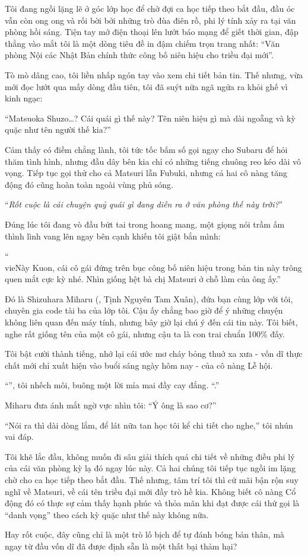 \documentclass[../main.tex]{subfiles}
\begin{document}
Tôi đang ngồi lặng lẽ ở góc lớp học để chờ đợi ca học tiếp theo bắt đầu, đầu óc vẫn còn ong ong và rối bời bởi những trò đùa điên rồ, phi lý tính xảy ra tại văn phòng hồi sáng. Tiện tay mở điện thoại lên lướt báo mạng để giết thời gian, đập thẳng vào mắt tôi là một dòng tiêu đề in đậm chiếm trọn trang nhất: ``Văn phòng Nội các Nhật Bản chính thức công bố niên hiệu cho triều đại mới''.

Tò mò dâng cao, tôi liền nhấp ngón tay vào xem chi tiết bản tin. Thế nhưng, vừa mới đọc lướt qua mấy dòng đầu tiên, tôi đã suýt nữa ngã ngửa ra khỏi ghế vì kinh ngạc:

``Matsuoka Shuzo\dots? Cái quái gì thế này? Tên niên hiệu gì mà dài ngoẵng và kỳ quặc như tên người thế kia?''

Cảm thấy có điềm chẳng lành, tôi tức tốc bấm số gọi ngay cho Subaru để hỏi thăm tình hình, nhưng đầu dây bên kia chỉ có những tiếng chuông reo kéo dài vô vọng. Tiếp tục gọi thử cho cả Matsuri lẫn Fubuki, nhưng cả hai cô nàng tăng động đó cũng hoàn toàn ngoài vùng phủ sóng.

``\textit{Rốt cuộc là cái chuyện quỷ quái gì đang diễn ra ở văn phòng thế này trời?}''

Đúng lúc tôi đang vò đầu bứt tai trong hoang mang, một giọng nói trầm ấm thình lình vang lên ngay bên cạnh khiến tôi giật bắn mình:

``\\vie{Này Kuon, cái cô gái đứng trên bục công bố niên hiệu trong bản tin này trông quen mắt cực kỳ nhé. Nhìn giống hệt bà chị Matsuri ở chỗ làm của ông ấy}.''

Đó là Shizuhara Miharu (, Tịnh Nguyên Tam Xuân), đứa bạn cùng lớp với tôi, chuyên gia code tài ba của lớp tôi. Cậu ấy chẳng bao giờ để ý những chuyện không liên quan đến máy tính, nhưng bây giờ lại chú ý đến cái tin này. Tôi biết, nghe rất giống tên của một cô gái, nhưng cậu ta là con trai chuẩn 100\%{} đấy.

Tôi bật cười thành tiếng, nhớ lại cái ước mơ cháy bỏng thuở xa xưa - vốn dĩ thực chất mới chỉ xuất hiện vào buổi sáng ngày hôm nay - của cô nàng Lễ hội.

``'', tôi nhếch môi, buông một lời mỉa mai đầy cay đắng. ``.''

Miharu đưa ánh mắt ngờ vực nhìn tôi: ``Ý ông là sao cơ?''

``Nói ra thì dài dòng lắm, để lát nữa tan học tôi kể chi tiết cho nghe,'' tôi nhún vai đáp.

Tôi khẽ lắc đầu, không muốn đi sâu giải thích quá chi tiết về những điều phi lý của cái văn phòng kỳ lạ đó ngay lúc này. Cả hai chúng tôi tiếp tục ngồi im lặng chờ cho ca học tiếp theo bắt đầu. Thế nhưng, tâm trí tôi thì cứ mãi bận rộn suy nghĩ về Matsuri, về cái tên triều đại mới đầy trò hề kia. Không biết cô nàng Cổ động đó có thực sự cảm thấy hạnh phúc và thỏa mãn khi đạt được cái thứ gọi là ``danh vọng'' theo cách kỳ quặc như thế này không nữa.

Hay rốt cuộc, đây cũng chỉ là một trò lố bịch để tự đánh bóng bản thân, mà ngay từ đầu vốn dĩ đã được định sẵn là một thất bại thảm hại?
\end{document}
